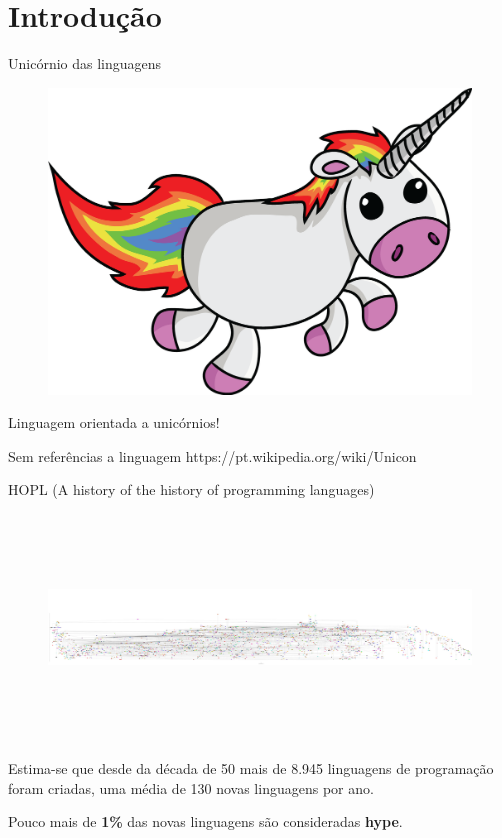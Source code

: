 \section{Introdução}

\begin{frame}[fragile]{Unicórnio das linguagens}
\begin{figure}[ht!]
  \centering
  \includegraphics[scale=0.19]{images/unicorn.png}
\end{figure}
\begin{center}
\small{Linguagem orientada a unicórnios!}
\end{center}

\begin{center}
\small{Sem referências a linguagem 
https://pt.wikipedia.org/wiki/Unicon}
\end{center}
\end{frame}

\begin{frame}[fragile]{HOPL (A history of the history of programming languages)}
\begin{figure}[ht!]
  \centering
  \includegraphics[width=\linewidth, height=6cm]{images/hopl.pdf}
\end{figure}

\begin{center}
\small{Estima-se que desde da década de 50 mais de 8.945 linguagens de programação foram criadas, uma média de 130 novas linguagens por ano.}
\end{center}

\begin{center}
Pouco mais de \textbf{1\%} das novas linguagens são consideradas \textbf{hype}.
\end{center}
\end{frame}